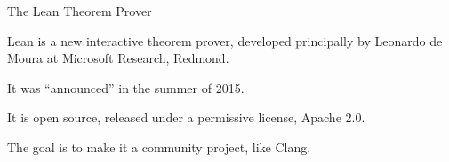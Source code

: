 \documentclass[xcolor=table]{beamer}
\begin{document}










\begin{frame}{The Lean Theorem Prover}

Lean is a new interactive theorem prover, developed principally by Leonardo de Moura at Microsoft Research, Redmond.

\bigskip

It was ``announced'' in the summer of 2015.

\bigskip

It is open source, released under a permissive license, Apache 2.0.

\bigskip

The goal is to make it a community project, like Clang.

\end{frame}
\end{document}
